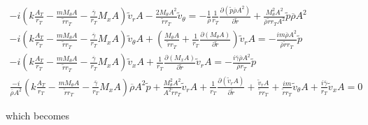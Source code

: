 \documentclass[12pt]{article}
\begin{document}
\begin{small}
\begin{eqnarray}
-i
\left(
k \frac{A_T}{r_T}
- \frac{ m M_{\theta} A}{\widetilde{r} r_T}
- \frac{\overline{\gamma}}{r_T} M_x A 
\right) \widetilde{v}_r A
-\frac{2 M_{\theta} A^2}{\widetilde{r} r_T} \widetilde{v}_{\theta} 
 = 
-\frac{1}{\overline{\rho}} 
\frac{1}{r_T}
\frac{\partial \left(\widetilde{p} \overline{\rho} A^2 \right) }{\partial \widetilde{r}} 
+\frac{M_{\theta}^2 A^2}{\overline{\rho} \widetilde{r} r_T A^2} \widetilde{p} \overline{\rho} A^2
\nonumber
\\
-i
\left(
k \frac{A_T}{r_T}
- \frac{ m M_{\theta} A}{\widetilde{r} r_T}
- \frac{\overline{\gamma}}{r_T} M_x A 
\right) \widetilde{v}_{\theta} A
+
\left(
\frac{M_{\theta} A}{\widetilde{r} r_T}
+
\frac{1}{r_T}
\frac{\partial \left(M_{\theta} A \right)}{\partial \widetilde{r}}
\right) \widetilde{v}_r A
 = 
-\frac{i m \overline{\rho} A^2}{\overline{\rho} \widetilde{r} r_T} \widetilde{p}
\nonumber
\\
-i
\left(
k \frac{A_T}{r_T}
- \frac{ m M_{\theta} A}{\widetilde{r} r_T}
- \frac{\overline{\gamma}}{r_T} M_x A
\right) \widetilde{v}_x A
+
\frac{1}{r_T}
\frac{\partial \left(M_x A \right)}{\partial \widetilde{r}} 
\widetilde{v}_r A
 = 
-\frac{i \overline{\gamma} \overline{\rho} A^2}{\overline{\rho} r_T} \widetilde{p}
\nonumber
\\
\frac{-i}{ \overline{\rho} A^2}
\left(
k \frac{A_T}{r_T}
- \frac{ m M_{\theta} A}{\widetilde{r} r_T} 
-  \frac{\overline{\gamma}}{r_T} M_x A
\right) \overline{\rho} A^2 \widetilde{p}
+\frac{M_{\theta}^2 A^2}{A^2 \widetilde{r} r_T}
\widetilde{v}_r A
+ 
\frac{1}{r_T}
\frac{\partial \left(\widetilde{v}_r A \right)}{\partial \widetilde{r}}
+ 
\frac{\widetilde{v}_r A}{\widetilde{r} r_T} 
+\frac{i m }{\widetilde{r} r_T} \widetilde{v}_{\theta} A
+ \frac{i \overline{\gamma}}{r_T} \widetilde{v}_x A
 = 
0
\nonumber
\end{eqnarray}
\end{small}%

which becomes
\end{document}
